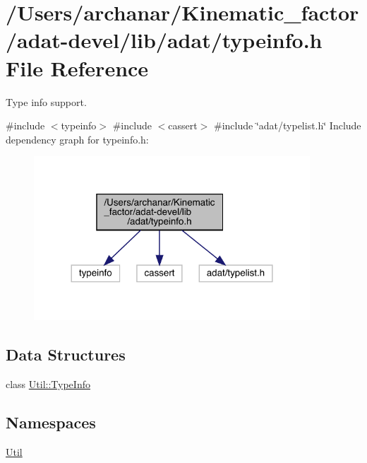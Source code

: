 \hypertarget{adat-devel_2lib_2adat_2typeinfo_8h}{}\section{/\+Users/archanar/\+Kinematic\+\_\+factor/adat-\/devel/lib/adat/typeinfo.h File Reference}
\label{adat-devel_2lib_2adat_2typeinfo_8h}


Type info support.  


{\ttfamily \#include $<$typeinfo$>$}\newline
{\ttfamily \#include $<$cassert$>$}\newline
{\ttfamily \#include \char`\"{}adat/typelist.\+h\char`\"{}}\newline
Include dependency graph for typeinfo.\+h\+:
\nopagebreak
\begin{figure}[H]
\begin{center}
\leavevmode
\includegraphics[width=293pt]{de/d94/adat-devel_2lib_2adat_2typeinfo_8h__incl}
\end{center}
\end{figure}
\subsection*{Data Structures}
\begin{DoxyCompactItemize}
\item 
class \mbox{\hyperlink{classUtil_1_1TypeInfo}{Util\+::\+Type\+Info}}
\end{DoxyCompactItemize}
\subsection*{Namespaces}
\begin{DoxyCompactItemize}
\item 
 \mbox{\hyperlink{namespaceUtil}{Util}}
\end{DoxyCompactItemize}
